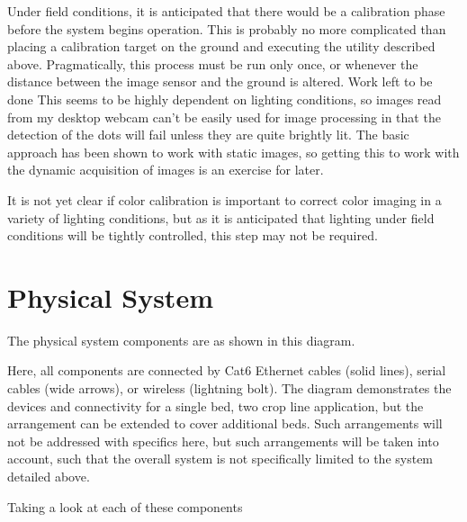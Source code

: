 \documentclass[letterpaper]{article}
\begin{document}

Under field conditions, it is anticipated that there would be a calibration phase before the system begins operation. This is probably no more complicated than placing a calibration target on the ground and executing the utility described above. Pragmatically, this process must be run only once, or whenever the distance between the image sensor and the ground is altered.
Work left to be done
This seems to be highly dependent on lighting conditions, so images read from my desktop webcam can’t be easily used for image processing in that the detection of the dots will fail unless they are quite brightly lit. The basic approach has been shown to work with static images, so getting this to work with the dynamic acquisition of images is an exercise for later.



It is not yet clear if color calibration is important to correct color imaging in a variety of lighting conditions, but as it is anticipated that lighting under field conditions will be tightly controlled, this step may not be required.

\section{Physical System}
The physical system components are as shown in this diagram.



Here, all components are connected by Cat6 Ethernet cables (solid lines), serial cables (wide arrows), or wireless (lightning bolt). The diagram demonstrates the devices and connectivity for a single bed, two crop line application, but the arrangement can be extended to cover additional beds. Such arrangements will not be addressed with specifics here, but such arrangements will be taken into account, such that the overall system is not specifically limited to the system detailed above.

Taking a look at each of these components
\end{document}
